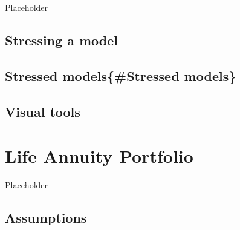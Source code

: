 \documentclass[]{book}
\begin{document}
Placeholder

\hypertarget{stressing-a-model}{%
\section{Stressing a model}\label{stressing-a-model}}

\hypertarget{stressed-modelsstressed-models}{%
\section{Stressed models\{\#Stressed models\}}\label{stressed-modelsstressed-models}}

\hypertarget{visual-tools}{%
\section{Visual tools}\label{visual-tools}}

\hypertarget{life-annuity-portfolio}{%
\chapter{Life Annuity Portfolio}\label{life-annuity-portfolio}}

Placeholder

\hypertarget{assumptions}{%
\section{Assumptions}\label{assumptions}}
\end{document}
